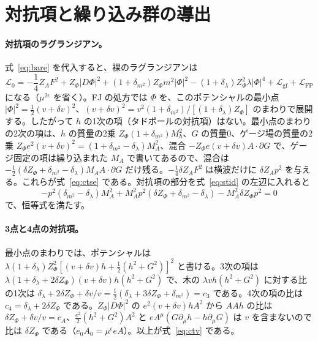 \documentclass[a4paper,10pt]{ltjsarticle}
\begin{document}
\section{対抗項と繰り込み群の導出}\label{app:ren}

\paragraph{対抗項のラグランジアン。}式~\eqref{eq:bare} を代入すると、裸のラグランジアンは
\begin{equation*}
\mathcal L_0=-\frac14Z_AF^2+Z_\Phi|D\Phi|^2+(1+\delta_{m^2})Z_\Phi m^2|\Phi|^2-(1+\delta_\lambda)Z_\Phi^2\lambda|\Phi|^4+\mathcal L_{\mathrm{gf}}+\mathcal L_{\mathrm{FP}}
\end{equation*}
になる（$\mu^{2\epsilon}$ を省く）。FJ の処方では $\Phi$ を、このポテンシャルの最小点 $|\Phi|^2=\frac12(v+\delta v)^2$、$(v+\delta v)^2=v^2(1+\delta_{m^2})/[(1+\delta_\lambda)Z_\Phi]$ のまわりで展開する。したがって $h$ の1次の項（タドポールの対抗項）はない。最小点のまわりの2次の項は、$h$ の質量の2乗 $Z_\Phi(1+\delta_{m^2})M_h^2$、$G$ の質量0、ゲージ場の質量の2乗 $Z_\Phi e^2(v+\delta v)^2=(1+\delta_{m^2}-\delta_\lambda)M_A^2$、混合 $-Z_\Phi e(v+\delta v)A\cdot\partial G$ で、ゲージ固定の項は繰り込まれた $M_A$ で書いてあるので、混合は $-\frac12(\delta Z_\Phi+\delta_{m^2}-\delta_\lambda)M_AA\cdot\partial G$ だけ残る。$-\frac14\delta Z_AF^2$ は横波だけに $\delta Z_Ap^2$ を与える。これらが式~\eqref{eq:ctse} である。対抗項の部分を式~\eqref{eq:stid} の左辺に入れると
\begin{equation*}
-p^2(\delta_{m^2}-\delta_\lambda)M_A^2+M_A^2p^2(\delta Z_\Phi+\delta_{m^2}-\delta_\lambda)-M_A^2\delta Z_\Phi p^2=0
\end{equation*}
で、恒等式を満たす。

\paragraph{3点と4点の対抗項。}最小点のまわりでは、ポテンシャルは $\lambda(1+\delta_\lambda)Z_\Phi^2[(v+\delta v)h+\frac12(h^2+G^2)]^2$ と書ける。3次の項は $\lambda(1+\delta_\lambda+2\delta Z_\Phi)(v+\delta v)h(h^2+G^2)$ で、木の $\lambda vh(h^2+G^2)$ に対する比の1次は $\delta_\lambda+2\delta Z_\Phi+\delta v/v=\frac12(\delta_\lambda+3\delta Z_\Phi+\delta_{m^2})=c_3$ である。4次の項の比は $c_4=\delta_\lambda+2\delta Z_\Phi$ である。$Z_\Phi|D\Phi|^2$ の $e^2(v+\delta v)hA^2$ から $AAh$ の比は $\delta Z_\Phi+\delta v/v=c_A$、$\frac{e^2}2(h^2+G^2)A^2$ と $eA^\mu(G\partial_\mu h-h\partial_\mu G)$ は $v$ を含まないので比は $\delta Z_\Phi$ である（$e_0A_0=\mu^\epsilon eA$）。以上が式~\eqref{eq:ctv} である。
\end{document}
